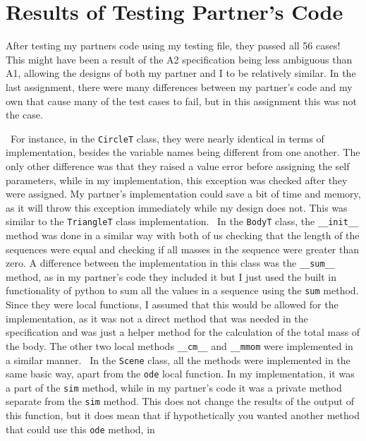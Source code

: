 \documentclass[12pt]{article}
\begin{document}
\section{Results of Testing Partner's Code}

After testing my partners code using my testing file, they passed all 56 cases! This might have 
been a result of the A2 specification being less ambiguous than A1, allowing the designs of both 
my partner and I to be relatively similar. In the last assignment, there were many differences 
between my partner's code and my own that cause many of the test cases to fail, but in this 
assignment this was not the case. 

~\newline\noindent For instance, in the \verb|CircleT| class, they were nearly identical in terms
of implementation, besides the variable names being different from one another. The only other 
difference was that they raised a value error before assigning the self parameters, while in my 
implementation, this exception was checked after they were assigned. My partner's implementation 
could save a bit of time and memory, as it will throw this exception immediately while my design 
does not. This was similar to the \verb|TriangleT| class implementation. 
~\newline\noindent In the \verb|BodyT| class, the \verb|__init__| method was done in a similar 
way with both of us checking that the length of the sequences were equal and checking if all 
masses in the sequence were greater than zero. A difference between the implementation in this 
class was the \verb|__sum__| method, as in my partner's code they included it but I just used the
built in functionality of python to sum all the values in a sequence using the \verb|sum| method.
Since they were local functions, I assumed that this would be allowed for the implementation, as 
it was not a direct method that was needed in the specification and was just a helper method for 
the calculation of the total mass of the body. The other two local methods \verb|__cm__| and 
\verb|__mmom| were implemented in a similar manner. 
~\newline\noindent In the \verb|Scene| class, all the methods were implemented in the same basic
way, apart from the \verb|ode| local function. In my implementation, it was a part of the 
\verb|sim| method, while in my partner's code it was a private method separate from the 
\verb|sim| method. This does not change the results of the output of this function, but it does
mean that if hypothetically you wanted another method that could use this \verb|ode| method, in 
\end{document}

